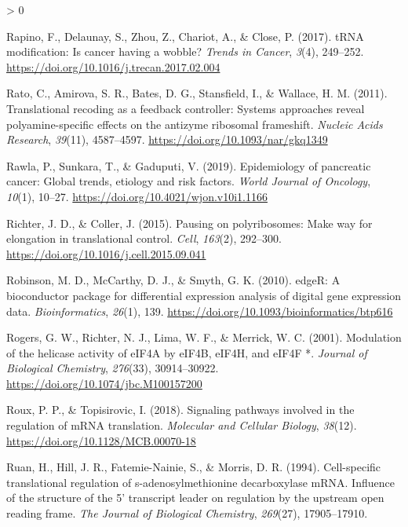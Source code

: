 \documentclass[
  12pt,
  openany]{book}
\newlength{\cslhangindent}
\newenvironment{CSLReferences}[2] %
 {%
  \setlength{\parindent}{0pt}
  \ifodd #1 \everypar{\setlength{\hangindent}{\cslhangindent}}\ignorespaces\fi
  \ifnum #2 > 0
  \setlength{\parskip}{#2\baselineskip}
  \fi
 }%
 {}
\begin{document}
\begin{CSLReferences}{1}{0}
\leavevmode\hypertarget{ref-Rapino2017}{}%
Rapino, F., Delaunay, S., Zhou, Z., Chariot, A., \& Close, P. (2017). {tRNA} modification: Is cancer having a wobble? \emph{Trends in Cancer}, \emph{3}(4), 249--252. \url{https://doi.org/10.1016/j.trecan.2017.02.004}

\leavevmode\hypertarget{ref-Rato2011}{}%
Rato, C., Amirova, S. R., Bates, D. G., Stansfield, I., \& Wallace, H. M. (2011). Translational recoding as a feedback controller: Systems approaches reveal polyamine-specific effects on the antizyme ribosomal frameshift. \emph{Nucleic Acids Research}, \emph{39}(11), 4587--4597. \url{https://doi.org/10.1093/nar/gkq1349}

\leavevmode\hypertarget{ref-Rawla2019}{}%
Rawla, P., Sunkara, T., \& Gaduputi, V. (2019). Epidemiology of pancreatic cancer: Global trends, etiology and risk factors. \emph{World Journal of Oncology}, \emph{10}(1), 10--27. \url{https://doi.org/10.4021/wjon.v10i1.1166}

\leavevmode\hypertarget{ref-Richter2015}{}%
Richter, J. D., \& Coller, J. (2015). Pausing on polyribosomes: Make way for elongation in translational control. \emph{Cell}, \emph{163}(2), 292--300. \url{https://doi.org/10.1016/j.cell.2015.09.041}

\leavevmode\hypertarget{ref-Robinson2010}{}%
Robinson, M. D., McCarthy, D. J., \& Smyth, G. K. (2010). {edgeR}: A bioconductor package for differential expression analysis of digital gene expression data. \emph{Bioinformatics}, \emph{26}(1), 139. \url{https://doi.org/10.1093/bioinformatics/btp616}

\leavevmode\hypertarget{ref-Rogers2001}{}%
Rogers, G. W., Richter, N. J., Lima, W. F., \& Merrick, W. C. (2001). Modulation of the helicase activity of {eIF}4A by {eIF}4B, {eIF}4H, and {eIF}4F *. \emph{Journal of Biological Chemistry}, \emph{276}(33), 30914--30922. \url{https://doi.org/10.1074/jbc.M100157200}

\leavevmode\hypertarget{ref-Roux2018}{}%
Roux, P. P., \& Topisirovic, I. (2018). Signaling pathways involved in the regulation of {mRNA} translation. \emph{Molecular and Cellular Biology}, \emph{38}(12). \url{https://doi.org/10.1128/MCB.00070-18}

\leavevmode\hypertarget{ref-Ruan1994}{}%
Ruan, H., Hill, J. R., Fatemie-Nainie, S., \& Morris, D. R. (1994). Cell-specific translational regulation of s-adenosylmethionine decarboxylase {mRNA}. Influence of the structure of the 5' transcript leader on regulation by the upstream open reading frame. \emph{The Journal of Biological Chemistry}, \emph{269}(27), 17905--17910.


\end{CSLReferences}
\end{document}
